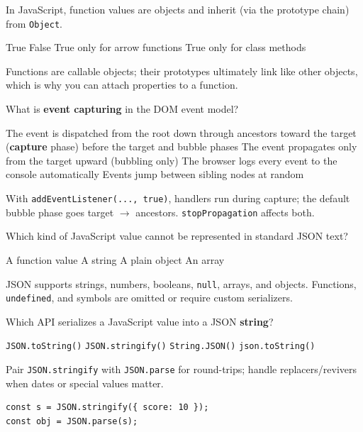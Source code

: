 \question[4]
In JavaScript, function values are objects and inherit (via the prototype chain) from \texttt{Object}.
\begin{choices}
  \CorrectChoice True
  \choice False
  \choice True only for arrow functions
  \choice True only for class methods
\end{choices}
\begin{solution}
  Functions are callable objects; their prototypes ultimately link like other objects, which is why you can attach properties to a function.
\end{solution}

\question[4]
What is \textbf{event capturing} in the DOM event model?
\begin{choices}
  \CorrectChoice The event is dispatched from the root down through ancestors toward the target (\textbf{capture} phase) before the target and bubble phases
  \choice The event propagates only from the target upward (bubbling only)
  \choice The browser logs every event to the console automatically
  \choice Events jump between sibling nodes at random
\end{choices}
\begin{solution}
  With \texttt{addEventListener(..., true)}, handlers run during capture; the default bubble phase goes target $\rightarrow$ ancestors. \texttt{stopPropagation} affects both.
\end{solution}

\question[4]
Which kind of JavaScript value cannot be represented in standard JSON text?
\begin{choices}
  \CorrectChoice A function value
  \choice A string
  \choice A plain object
  \choice An array
\end{choices}
\begin{solution}
  JSON supports strings, numbers, booleans, \texttt{null}, arrays, and objects. Functions, \texttt{undefined}, and symbols are omitted or require custom serializers.
\end{solution}

\question[4]
Which API serializes a JavaScript value into a JSON \textbf{string}?
\begin{choices}
  \choice \texttt{JSON.toString()}
  \CorrectChoice \texttt{JSON.stringify()}
  \choice \texttt{String.JSON()}
  \choice \texttt{json.toString()}
\end{choices}
\begin{solution}
  Pair \texttt{JSON.stringify} with \texttt{JSON.parse} for round-trips; handle replacers/revivers when dates or special values matter.
\begin{lstlisting}[style=js]
const s = JSON.stringify({ score: 10 });
const obj = JSON.parse(s);
\end{lstlisting}
\end{solution}

